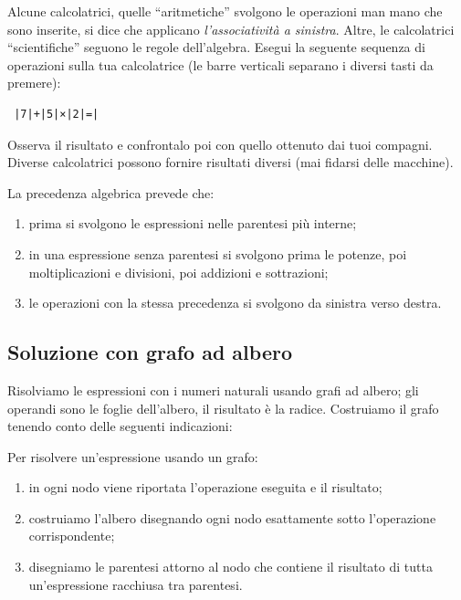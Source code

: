 \osservazione Alcune calcolatrici, quelle ``aritmetiche'' svolgono le 
operazioni man mano che sono inserite, si dice che applicano 
\emph{l'associatività a sinistra}. Altre, le calcolatrici ``scientifiche'' 
seguono le regole dell'algebra. Esegui la seguente sequenza di operazioni 
sulla tua calcolatrice 
(le barre verticali separano i diversi tasti da premere):
\begin{verbatim}
 |7|+|5|×|2|=|
\end{verbatim} 

Osserva il risultato e confrontalo poi con quello ottenuto dai tuoi 
compagni. 
Diverse calcolatrici possono fornire risultati diversi (mai fidarsi delle
macchine).

La precedenza algebrica prevede che:

\begin{enumerate} [nosep]
 \item prima si svolgono le espressioni nelle parentesi più interne; 
 \item in una espressione senza parentesi si svolgono prima le potenze, 
  poi moltiplicazioni e divisioni, poi addizioni e sottrazioni;
 \item le operazioni con la stessa precedenza si svolgono da sinistra verso 
  destra.
\end{enumerate}

\subsection{Soluzione con grafo ad albero}

Risolviamo le espressioni con i numeri naturali usando grafi ad albero;
gli operandi sono le foglie dell'albero, il risultato è la radice. 
Costruiamo il grafo tenendo conto delle seguenti indicazioni:

\begin{procedura}
 Per risolvere un'espressione usando un grafo:
\begin{enumerate} [noitemsep]
 \item in ogni nodo viene riportata l'operazione eseguita e il risultato;
 \item costruiamo l'albero disegnando ogni nodo esattamente sotto
  l'operazione corrispondente;
 \item disegniamo le parentesi attorno al nodo che contiene il
  risultato di tutta un'espressione racchiusa tra parentesi.
\end{enumerate}
\end{procedura}

